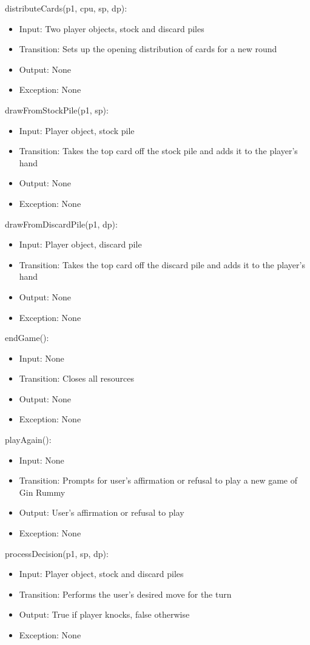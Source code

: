 \documentclass[12pt, titlepage]{article}
\begin{document}
\noindent distributeCards(p1, cpu, sp, dp):
\begin{itemize}
    \item Input: Two player objects, stock and discard piles
    \item Transition: Sets up the opening distribution of cards for a new round
    \item Output: None
    \item Exception: None
\end{itemize}

\noindent drawFromStockPile(p1, sp):
\begin{itemize}
    \item Input: Player object, stock pile
    \item Transition: Takes the top card off the stock pile and adds it to the player's hand
    \item Output: None
    \item Exception: None
\end{itemize}

\noindent drawFromDiscardPile(p1, dp):
\begin{itemize}
    \item Input: Player object, discard pile
    \item Transition: Takes the top card off the discard pile and adds it to the player's hand
    \item Output: None
    \item Exception: None
\end{itemize}

\noindent endGame():
\begin{itemize}
    \item Input: None
    \item Transition: Closes all resources
    \item Output: None
    \item Exception: None
\end{itemize}

\noindent playAgain():
\begin{itemize}
    \item Input: None
    \item Transition: Prompts for user's affirmation or refusal to play a new game of Gin Rummy
    \item Output: User's affirmation or refusal to play
    \item Exception: None
\end{itemize}

\noindent processDecision(p1, sp, dp):
\begin{itemize}
    \item Input: Player object, stock and discard piles
    \item Transition: Performs the user's desired move for the turn
    \item Output: True if player knocks, false otherwise
    \item Exception: None
\end{itemize}
\end{document}
